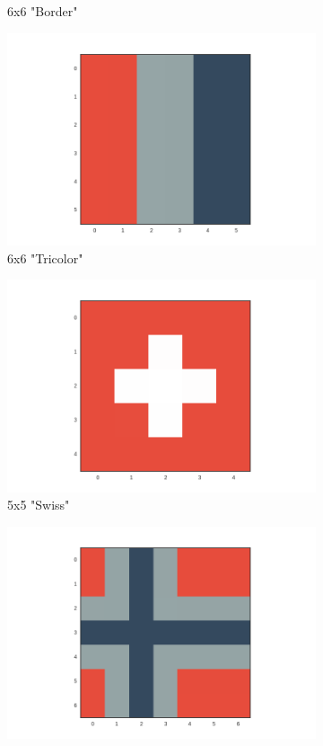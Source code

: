 \begin{figure}
\begin{subfigure}[b]{.20\textwidth}
\caption{6x6 "Border"}
\end{subfigure}%
\begin{subfigure}[b]{.20\textwidth}
\centering
\includegraphics[width=\textwidth]{fig/tricolor}
\caption{6x6 "Tricolor"}
\end{subfigure}%
\begin{subfigure}[b]{.20\textwidth}
\centering
\includegraphics[width=\textwidth]{fig/swiss}
\caption{5x5 "Swiss"}
\end{subfigure}%
\begin{subfigure}[b]{.20\textwidth}
\centering
\includegraphics[width=\textwidth]{fig/nordic}

\end{subfigure}
\end{figure}
